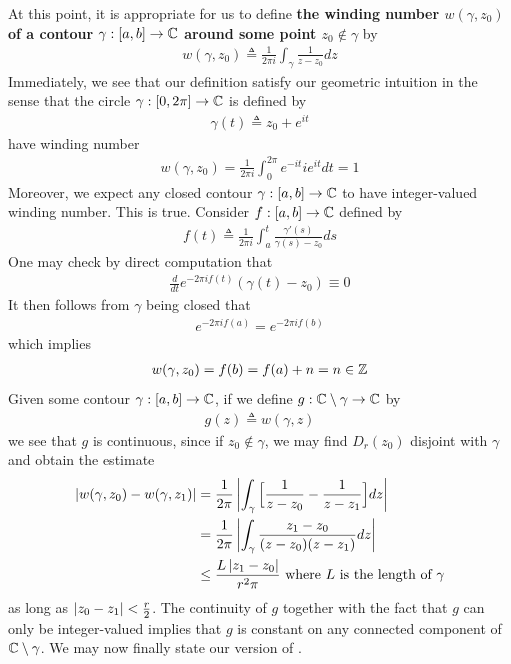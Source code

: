 \documentclass{report}
\begin{document}
\begin{mdframed}
At this point, it is appropriate for us to define \textbf{the winding number $w(\gamma ,z_0)$ of a contour $\gamma :[a,b]\rightarrow \mathbb{C}$ around some point $z_0\not\in \gamma $} by 
\begin{align*}
w(\gamma ,z_0)\triangleq  \frac{1}{2\pi  i}\int_{\gamma } \frac{1}{z-z_0}dz
\end{align*}
Immediately, we see that our definition satisfy our geometric intuition in the sense that the circle $\gamma :[0,2\pi  ]\rightarrow \mathbb{C}$ is defined by 
\begin{align*}
\gamma (t)\triangleq z_0 + e^{it}
\end{align*}
have winding number  
\begin{align*}
w(\gamma ,z_0)= \frac{1}{2\pi i}\int_0^{2\pi } e^{- it }ie^{it}dt= 1
\end{align*}
Moreover, we expect any closed contour $\gamma :[a,b]\rightarrow \mathbb{C}$ to have integer-valued winding number. This is true. Consider $f:[a,b]\rightarrow \mathbb{C}$ defined by 
\begin{align*}
f(t)\triangleq \frac{1}{2\pi  i}\int_a^t \frac{\gamma '(s)}{\gamma (s)-z_0}ds
\end{align*}
One may check by direct computation that 
\begin{align*}
\frac{d}{dt}e^{-2\pi  if (t)}(\gamma (t)-z_0)\equiv 0 
\end{align*}
It then follows from $\gamma $ being closed that 
\begin{align*}
e^{-2\pi  if(a)}=e^{-2\pi  if(b)}
\end{align*}
which implies 
\begin{align*}
w(\gamma ,z_0)=f(b)=f(a)+n=n\in\mathbb{Z}
\end{align*}
Given some contour $\gamma :[a,b]\rightarrow \mathbb{C}$, if we define $g:\mathbb{C}\setminus \gamma \rightarrow \mathbb{C}$ by 
\begin{align*}
g(z)\triangleq w(\gamma ,z)
\end{align*}
we see that $g$ is continuous, since if $z_0\not\in \gamma $, we may find $D_r(z_0)$ disjoint with $\gamma $ and obtain the estimate 
 \begin{align*}
\left|w(\gamma ,z_0)-w(\gamma ,z_1)\right|&= \frac{1}{2\pi  }\left|\int_\gamma \Big[ \frac{1}{z-z_0}-\frac{1}{z-z_1} \Big]dz\right| \\
&=\frac{1}{2\pi  }\left|\int_{\gamma } \frac{z_1-z_0}{(z-z_0)(z-z_1)}dz\right| \\
&\leq \frac{L \left|z_1-z_0\right|}{ r^2 \pi  }\text{ where }L\text{ is the length of }\gamma 
\end{align*}
as long as $\left|z_0-z_1\right|<\frac{r}{2}$. The continuity of $g$ together with the fact that  $g$ can only be integer-valued implies that  $g$ is constant on any connected component of  $\mathbb{C} \setminus \gamma $. We may now finally state our version of . 
\end{mdframed}
\end{document}
